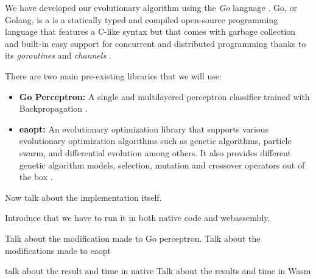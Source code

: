 We have developed our evolutionary algorithm using the \textit{Go} language \cite{go}. Go, or Golang, is a is a statically typed and compiled open-source programming language that features a C-like syntax but that comes with garbage collection and built-in easy support for concurrent and distributed programming thanks to its \textit{goroutines} \cite{channels} and \textit{channels} \cite{channels}.

There are two main pre-existing libraries that we will use:

\begin{itemize}
	\item \textbf{Go Perceptron:} A single and multilayered perceptron classifier trained with Backpropagation \cite{go-perceptron-go}.
	\item \textbf{eaopt:} An evolutionary optimization library that supports various evolutionary optimization algorithms such as genetic algorithms, particle swarm, and differential evolution among others. It also provides different genetic algorithm models, selection, mutation and crossover operators out of the box \cite{eaopt}.
\end{itemize}

Now talk about the implementation itself.

Introduce that we have to run it in both native code and webassembly.

Talk about the modification made to Go perceptron.
Talk about the modifications made to eaopt

talk about the result and time in native
Talk about the results and time in Wasm

